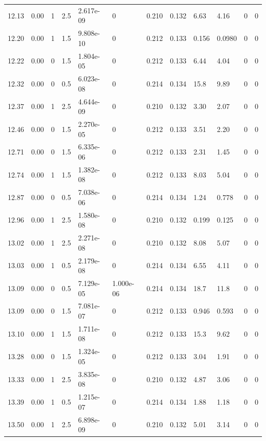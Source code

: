 \documentclass[preview]{standalone}
\begin{document}
{{{{{\begin{tabular}{L{1.2cm}C{1.2cm} C{0.3cm}C{0.5cm} C{1.4cm}C{1.4cm} C{1.4cm}C{1.4cm} C{1.6cm}C{1.6cm} C{1.6cm}C{1.6cm}}
  12.13  &  0.00  & 1     & 2.5 &  2.617e-09  & 0  &  0.210&   0.132& 6.63 & 4.16   &  0 & 0  \\ 
  12.20  &  0.00  & 1     & 1.5 &  9.808e-10  & 0  &  0.212&   0.133& 0.156 & 0.0980   &  0 & 0  \\ 
  12.22  &  0.00  & 0     & 1.5 &  1.804e-05  & 0  &  0.212&   0.133& 6.44 & 4.04   &  0 & 0  \\ 
  12.32  &  0.00  & 0     & 0.5 &  6.023e-08  & 0  &  0.214&   0.134& 15.8 & 9.89   &  0 & 0  \\ 
  12.37  &  0.00  & 1     & 2.5 &  4.644e-09  & 0  &  0.210&   0.132& 3.30 & 2.07   &  0 & 0  \\ 
  12.46  &  0.00  & 0     & 1.5 &  2.270e-05  & 0  &  0.212&   0.133& 3.51 & 2.20   &  0 & 0  \\ 
  12.71  &  0.00  & 0     & 1.5 &  6.335e-06  & 0  &  0.212&   0.133& 2.31 & 1.45   &  0 & 0  \\ 
  12.74  &  0.00  & 1     & 1.5 &  1.382e-08  & 0  &  0.212&   0.133& 8.03 & 5.04   &  0 & 0  \\ 
  12.87  &  0.00  & 0     & 0.5 &  7.038e-06  & 0  &  0.214&   0.134& 1.24 & 0.778   &  0 & 0  \\ 
  12.96  &  0.00  & 1     & 2.5 &  1.580e-08  & 0  &  0.210&   0.132& 0.199 & 0.125   &  0 & 0  \\ 
  13.02  &  0.00  & 1     & 2.5 &  2.271e-08  & 0  &  0.210&   0.132& 8.08 & 5.07   &  0 & 0  \\ 
  13.03  &  0.00  & 1     & 0.5 &  2.179e-08  & 0  &  0.214&   0.134& 6.55 & 4.11   &  0 & 0  \\ 
  13.09  &  0.00  & 0     & 0.5 &  7.129e-05  & 1.000e-06  &  0.214&   0.134& 18.7 & 11.8   &  0 & 0  \\ 
  13.09  &  0.00  & 0     & 1.5 &  7.081e-07  & 0  &  0.212&   0.133& 0.946 & 0.593   &  0 & 0  \\ 
  13.10  &  0.00  & 1     & 1.5 &  1.711e-08  & 0  &  0.212&   0.133& 15.3 & 9.62   &  0 & 0  \\ 
  13.28  &  0.00  & 0     & 1.5 &  1.324e-05  & 0  &  0.212&   0.133& 3.04 & 1.91   &  0 & 0  \\ 
  13.33  &  0.00  & 1     & 2.5 &  3.835e-08  & 0  &  0.210&   0.132& 4.87 & 3.06   &  0 & 0  \\ 
  13.39  &  0.00  & 1     & 0.5 &  1.215e-07  & 0  &  0.214&   0.134& 1.88 & 1.18   &  0 & 0  \\ 
  13.50  &  0.00  & 1     & 2.5 &  6.898e-09  & 0  &  0.210&   0.132& 5.01 & 3.14   &  0 & 0  \\ 

\end{tabular}}}}}}
\end{document}
